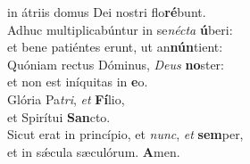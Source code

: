 \oddverse in átriis domus Dei nostri flo\textbf{ré}bunt.\\
\evenverse Adhuc multiplicabúntur in se\textit{né}\textit{cta} \textbf{ú}beri:~\*\\
\evenverse et bene patiéntes erunt, ut an\textbf{nún}tient:\\
\oddverse Quóniam rectus Dóminus, \textit{De}\textit{us} \textbf{no}ster:~\*\\
\oddverse et non est iníquitas in \textbf{e}o.\\
\evenverse Glória Pa\textit{tri}, \textit{et} \textbf{Fí}lio,~\*\\
\evenverse et Spirítui \textbf{San}cto.\\
\oddverse Sicut erat in princípio, et \textit{nunc}, \textit{et} \textbf{sem}per,~\*\\
\oddverse et in sǽcula sæculórum. \textbf{A}men.\\
